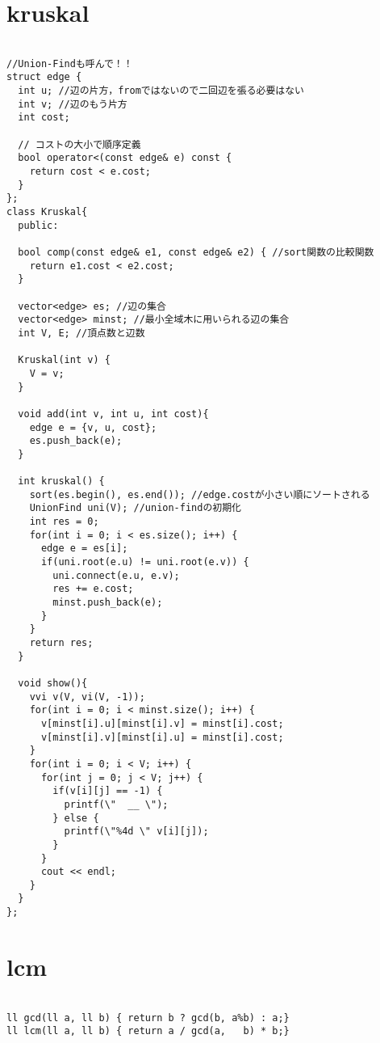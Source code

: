 \documentclass[a4j,titlepage]{jarticle} %
\begin{document}
\section{kruskal}
\color{black}
\begin{lstlisting}[caption=kruskal]

//Union-Findも呼んで！！
struct edge {
  int u; //辺の片方，fromではないので二回辺を張る必要はない
  int v; //辺のもう片方
  int cost;

  // コストの大小で順序定義
  bool operator<(const edge& e) const {
    return cost < e.cost;
  }
};
class Kruskal{
  public:

  bool comp(const edge& e1, const edge& e2) { //sort関数の比較関数
    return e1.cost < e2.cost;
  }

  vector<edge> es; //辺の集合
  vector<edge> minst; //最小全域木に用いられる辺の集合
  int V, E; //頂点数と辺数

  Kruskal(int v) {
    V = v;
  }

  void add(int v, int u, int cost){
    edge e = {v, u, cost};
    es.push_back(e);
  }

  int kruskal() {
    sort(es.begin(), es.end()); //edge.costが小さい順にソートされる
    UnionFind uni(V); //union-findの初期化
    int res = 0;
    for(int i = 0; i < es.size(); i++) {
      edge e = es[i];
      if(uni.root(e.u) != uni.root(e.v)) {
        uni.connect(e.u, e.v);
        res += e.cost;
        minst.push_back(e);
      }
    }
    return res;
  }

  void show(){
    vvi v(V, vi(V, -1));
    for(int i = 0; i < minst.size(); i++) {
      v[minst[i].u][minst[i].v] = minst[i].cost;
      v[minst[i].v][minst[i].u] = minst[i].cost;
    }
    for(int i = 0; i < V; i++) {
      for(int j = 0; j < V; j++) {
        if(v[i][j] == -1) {
          printf(\"  __ \");
        } else {
          printf(\"%4d \" v[i][j]);
        }
      }
      cout << endl;
    }
  }
};

\end{lstlisting}

\color{white}
\section{lcm}
\color{black}
\begin{lstlisting}[caption=lcm]

ll gcd(ll a, ll b) { return b ? gcd(b, a%b) : a;}
ll lcm(ll a, ll b) { return a / gcd(a,   b) * b;}

\end{lstlisting}
\end{document}
